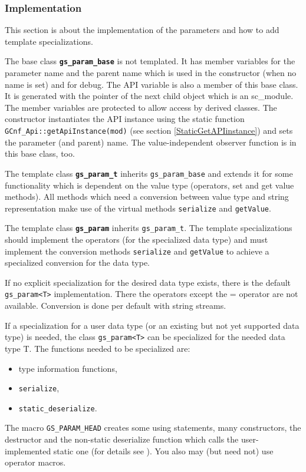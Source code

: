 \subsubsection{Implementation}\label{sec:ParamImplementation}
This section is about the implementation of the \GreenConfig parameters and how to add template specializations.

The base class {\bf \lstinline|gs_param_base|} is not templated. It has member variables for the
parameter name and the parent name which is used in the constructor (when no name is set) and for debug. The \GreenConfig API variable is also a member of this base class. It is generated with the pointer of the next child object which is an sc\_module. The member variables are protected to allow access by derived classes. The constructor instantiates the API instance using the static function \lstinline|GCnf_Api::getApiInstance(mod)| (see section \ref{StaticGetAPIinstance}) and sets the parameter (and parent) name. The value-independent observer function is in this base class, too.

The template class {\bf \lstinline|gs_param_t|} inherits \lstinline|gs_param_base| and extends it for some functionality which is dependent on the value type (operators, set and get value methods). All methods which need a conversion between value type and string representation make use of the virtual methods \lstinline|serialize| and \lstinline|getValue|.

The template class {\bf \lstinline|gs_param|} inherits \lstinline|gs_param_t|. The template specializations should implement the operators (for the specialized data type) and must implement the conversion methods \lstinline|serialize| and \lstinline|getValue| to achieve a specialized conversion for the data type.

If no explicit specialization for the desired data type exists, there is the default \lstinline|gs_param<T>| implementation. There the operators except the = operator are not available. Conversion is done per default with string streams.

If a specialization for a user data type (or an existing but not yet supported data type) is needed, the class
\mbox{\lstinline|gs_param<T>|} can be specialized for the needed data type T. The functions needed
to be specialized are: 
\begin{itemize}
  \item type information functions, 
  \item \lstinline|serialize|, 
  \item \mbox{\lstinline|static_deserialize|.} 
\end{itemize}
The macro \lstinline|GS_PARAM_HEAD| creates some using statements, many constructors, the destructor and the non-static deserialize function which calls the user-implemented static one (for details see ). You also may (but need not) use operator macros. 

